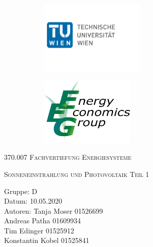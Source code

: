 \documentclass[a4paper,12pt]{article}
\begin{document}
	\begin{titlepage}
		\begin{figure}[h]
			\begin{subfigure}{1cm}
				\includegraphics[width=5cm]{img/TU_Logo}
			\end{subfigure}
			\hspace{10cm}
			\begin{subfigure}{6cm}
				\includegraphics[width=4.5cm]{img/EEG_logo}
			\end{subfigure}
		\end{figure}
		\centering
		\bigskip \bigskip \bigskip \bigskip \bigskip
		\scshape\LARGE 370.007 Fachvertiefung Energiesysteme\par
		\vspace{1cm}
		\scshape\large Sonneneinstrahlung und Photovoltaik Teil 1 \par
		\vspace{8cm}
		\raggedright
		\large Gruppe: D \\
		Datum: 10.05.2020 \\
		Autoren: Tanja Moser 01526699\\
		\hspace{2.4cm} Andreas Patha 01609934\\
		\hspace{2.4cm} Tim Edinger 01525912\\
		\hspace{2.4cm} Konstantin Kobel 01525841\\
		\vfill
		\large \par
	\end{titlepage}
\end{document}
